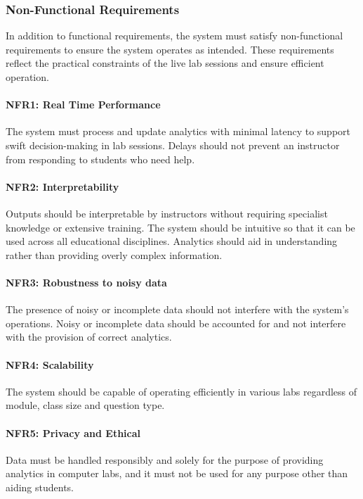 \subsubsection{Non-Functional Requirements}
In addition to functional requirements, the system must satisfy non-functional requirements to ensure the system operates as intended. These requirements reflect the practical constraints of the live lab sessions and ensure efficient operation.

\paragraph{NFR1: Real Time Performance }
The system must process and update analytics with minimal latency to support swift decision-making in lab sessions. Delays should not prevent an instructor from responding to students who need help.

\paragraph{NFR2: Interpretability}
Outputs should be interpretable by instructors without requiring specialist knowledge or extensive training. The system should be intuitive so that it can be used across all educational disciplines. Analytics should aid in understanding rather than providing overly complex information.

\paragraph{NFR3: Robustness to noisy data}
The presence of noisy or incomplete data should not interfere with the system's operations. Noisy or incomplete data should be accounted for and not interfere with the provision of correct analytics.

\paragraph{NFR4: Scalability}
The system should be capable of operating efficiently in various labs regardless of module, class size and question type.

\paragraph{NFR5: Privacy and Ethical}
Data must be handled responsibly and solely for the purpose of providing analytics in computer labs, and it must not be used for any purpose other than aiding students.

